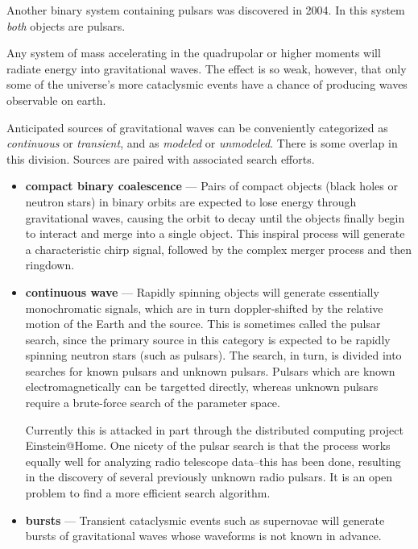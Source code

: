 Another binary system containing pulsars was discovered in 2004.  In
this system \emph{both} objects are
pulsars. \cite{Lyne2004DoublePulsar,Kramer2006Tests}

Any system of mass accelerating in the quadrupolar or higher moments
will radiate energy into gravitational waves.  The effect is so weak,
however, that only some of the universe's more cataclysmic events have
a chance of producing waves observable on earth.

Anticipated sources of gravitational waves can be conveniently
categorized as \emph{continuous} or \emph{transient}, and as
\emph{modeled} or \emph{unmodeled}.  There is some overlap in this
division.  Sources are paired with associated search efforts.

\begin{itemize}

\item \textbf{compact binary coalescence} --- Pairs of compact objects
  (black holes or neutron stars) in binary orbits are expected to lose
  energy through gravitational waves, causing the orbit to decay until
  the objects finally begin to interact and merge into a single
  object.  This inspiral process will generate a characteristic chirp
  signal, followed by the complex merger process and then ringdown.

\item \textbf{continuous wave} --- Rapidly spinning objects will
  generate essentially monochromatic signals, which are in turn
  doppler-shifted by the relative motion of the Earth and the source.
  This is sometimes called the pulsar search, since the primary source
  in this category is expected to be rapidly spinning neutron stars
  (such as pulsars).  The search, in turn, is divided into searches
  for known pulsars and unknown pulsars.  Pulsars which are known
  electromagnetically can be targetted directly, whereas unknown
  pulsars require a brute-force search of the parameter space.

  Currently this is attacked in part through the distributed computing
  project Einstein@Home.  One nicety of the pulsar search is that the
  process works equally well for analyzing radio telescope data--this
  has been done, resulting in the discovery of several previously
  unknown radio pulsars\cite{Knispel2010Pulsar}.  It is an open
  problem to find a more efficient search algorithm.

\item \textbf{bursts} --- Transient cataclysmic events such as
  supernovae will generate bursts of gravitational waves whose
  waveforms is not known in advance.  


\end{itemize}
